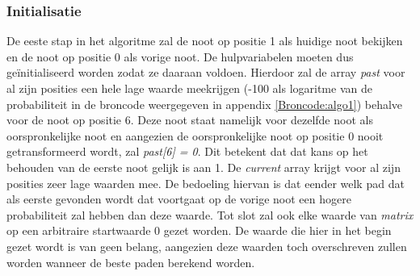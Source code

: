 \subsubsection{Initialisatie}
De eeste stap in het algoritme zal de noot op positie 1 als huidige noot bekijken en de noot op positie 0 als vorige noot. De hulpvariabelen moeten dus ge\"initialiseerd worden zodat ze daaraan voldoen. Hierdoor zal de array \textit{past} voor al zijn posities een hele lage waarde meekrijgen (-100 als logaritme van de probabiliteit in de broncode weergegeven in appendix \ref{Broncode:algo1}) behalve voor de noot op positie 6. Deze noot staat namelijk voor dezelfde noot als oorspronkelijke noot en aangezien de oorspronkelijke noot op positie 0 nooit getransformeerd wordt, zal \textit{past[6] = 0}. Dit betekent dat dat kans op het behouden van de eerste noot gelijk is aan 1. De \textit{current} array krijgt voor al zijn posities zeer lage waarden mee. De bedoeling hiervan is dat eender welk pad dat als eerste gevonden wordt dat voortgaat op de vorige noot een hogere probabiliteit zal hebben dan deze waarde. Tot slot zal ook elke waarde van \textit{matrix} op een arbitraire startwaarde 0 gezet worden. De waarde die hier in het begin gezet wordt is van geen belang, aangezien deze waarden toch overschreven zullen worden wanneer de beste paden berekend worden.

